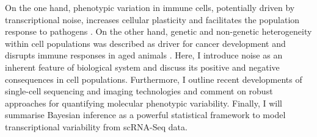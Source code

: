\begin{Abstract}
On the one hand, phenotypic variation in immune cells, potentially driven by transcriptional noise, increases cellular plasticity and facilitates the population response to pathogens \citep{Shalek2014, Kellogg2015}. 
On the other hand, genetic and non-genetic heterogeneity within cell populations was described as driver for cancer development \citep{Marusyk2012} and disrupts immune responses in aged animals \citep{Martinez-jimenez2017}. 
Here, I introduce noise as an inherent feature of biological system and discuss its positive and negative consequences in cell populations. 
Furthermore, I outline recent developments of single-cell sequencing and imaging technologies and comment on robust approaches for quantifying molecular phenotypic variability. 
Finally, I will summarise Bayesian inference as a powerful statistical framework to model transcriptional variability from \gls{scRNA-Seq} data.
\end{Abstract}

\newpage


\newpage

\newpage

\newpage

\newpage

\newpage

